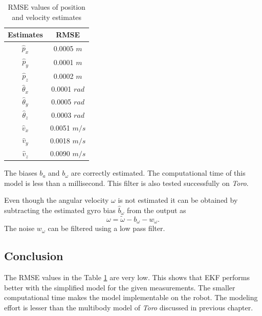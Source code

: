 \begin{table}
    \centering
    \begin{tabular}{|c|c|}
    \hline
    Estimates &RMSE \\ \hline
    $\hat p_x$ &0.0005 $m$\\
    $\hat p_y$ &0.0001 $m$\\
    $\hat p_z$ &0.0002 $m$\\
    $\hat\theta_x$ &0.0001 $rad$\\
    $\hat\theta_y$ &0.0005 $rad$\\
    $\hat\theta_z$ &0.0003 $rad$\\ 
    $\hat v_x$ &0.0051 $m/s$\\
    $\hat v_y$ &0.0018 $m/s$\\
    $\hat v_z$ &0.0090 $m/s$\\\hline
    \end{tabular} \hspace{1cm}
    \caption{RMSE values of position and velocity estimates}
    \label{tab:simp_rmse}
\end{table}

The biases $b_a$ and $b_\omega$ are correctly estimated. The computational time of this model is less than a millisecond. This filter is also tested successfully on \emph{Toro}. 

Even though the angular velocity $\omega$ is not estimated it can be obtained by subtracting the estimated gyro bias $\hat b_\omega$ from the output as
$$ \omega = \tilde{\omega} - b_\omega - w_\omega.$$ 
The noise $w_\omega$ can be filtered using a low pass filter.

\subsection{Conclusion}
The RMSE values in the Table \ref{tab:simp_rmse} are very low. This shows that EKF performs better with the simplified model for the given measurements. The smaller computational time makes the model implementable on the robot. The modeling effort is lesser than the multibody model of \emph{Toro} discussed in previous chapter. 